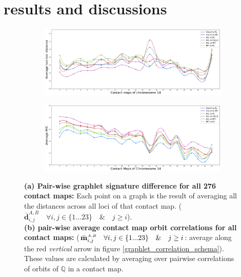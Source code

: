 \documentclass[a4,center,fleqn]{NAR}
\begin{document}
\section{results and discussions}

\begin{figure}
    \centering
    \begin{subfigure}[b]{\textwidth}
        \includegraphics[width=\textwidth]{figures/orbit-distances_chr14.png}
        \caption{}
        \label{fig:orbit-distances_chr14}
    \end{subfigure}
    \begin{subfigure}[b]{\textwidth}
        \includegraphics[width=\textwidth]{figures/contact_maps_correlations_chr14.png}
        \caption{}
        \label{fig:contact_maps_correlations_chr14}
    \end{subfigure}
    \caption{   
        \textbf{(a) Pair-wise graphlet signature difference for
        all 276 contact maps:}
        Each point on a graph is the result of averaging all
        the distances across all loci of that contact map.
        ($\bar{\mathbf{d}}^{\scriptscriptstyle A,B}_{i,j} \quad
        \forall i,j \in \{1 ... 23\} \quad \& \quad j \ge i$).  
        \vspace{.1cm} \\
        \textbf{(b) pair-wise average contact map orbit correlations
         for all contact maps:}
        ($\bar{\mathbf{m}}^{\scriptscriptstyle \scriptscriptstyle A,B}_{i,j} 
        \quad \forall i,j \in \{1 ... 23\} \quad \& \quad j \ge i$:
        average along the red \textit{vertical} arrow in figure 
        \ref{graphlet_correlation_schema}).
        These values are calculated by averaging over 
        pairwise correlations of orbits of
        $\mathbb{Q}$ in a contact map.
     }
    \label{fig:results_all}
\end{figure}
\end{document}

